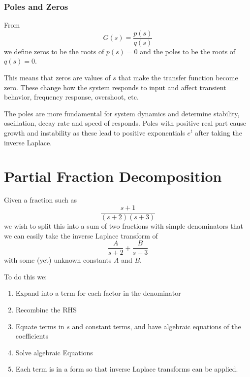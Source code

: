 \subsubsection{Poles and Zeros}
From
\begin{equation*}
  G(s) = \frac{p(s)}{q(s)}
\end{equation*}
we define zeros to be the roots of $p(s) = 0$ and the poles to be the roots of $q(s) = 0$. 

This means that zeros are values of $s$ that make the transfer function become zero.
These change how the system responds to input and affect transient behavior, frequency response, overshoot, etc. 

The poles are more fundamental for system dynamics and determine stability, oscillation, decay rate and speed of responds.
Poles with positive real part cause growth and instability as these lead to positive exponentials $e^{t}$ after taking the inverse Laplace.

\section{Partial Fraction Decomposition}
Given a fraction such as
\begin{equation*}
  \frac{s+1}{(s+2)(s+3)}
\end{equation*}
we wish to split this into a sum of two fractions with simple denominators that we can easily take the inverse Laplace transform of
\begin{equation*}
  \frac{A}{s+2} + \frac{B}{s+3}
\end{equation*}
with some (yet) unknown constants $A$ and $B$. 

To do this we:
\begin{enumerate}
  \item Expand into a term for each factor in the denominator
  \item Recombine the RHS
  \item Equate terms in $s$ and constant terms, and have algebraic equations of the coefficients
  \item Solve algebraic Equations
  \item Each term is in a form so that inverse Laplace transforms can be applied.
\end{enumerate}

